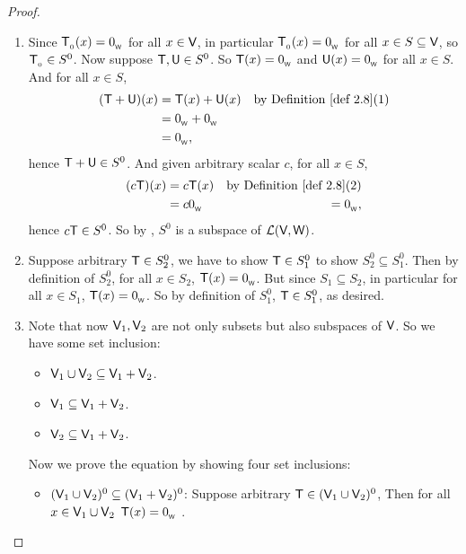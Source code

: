 \begin{proof} \ 
\begin{enumerate}
\item Since \(\textsf{T}_{_0}(x) = 0_{_{\textsf{W}}}\) for all \(x \in \textsf{V}\), in particular \(\textsf{T}_{_0}(x) = 0_{_{\textsf{W}}}\) for all \(x \in S \subseteq \textsf{V}\), so \(\textsf{T}_{_0} \in S^0\).
    Now suppose \(\textsf{T}, \textsf{U} \in S^0\).
    So \(\textsf{T}(x) = 0_{_{\textsf{W}}}\) and \(\textsf{U}(x) = 0_{_{\textsf{W}}}\) for all \(x \in S\).
    And for all \(x \in S\),
    \begin{align*}
        (\T + \U)(x) & = \T(x) + \U(x) & \text{by \DEF{2.8}(1)} \\
                     & = \OW + \OW \\
                     & = \OW,
    \end{align*}
    hence \(\textsf{T} + \textsf{U} \in S^0\).
    And given arbitrary scalar \(c\), for all \(x \in S\),
    \begin{align*}
        (c\T)(x) & = c\T(x) & \text{by \DEF{2.8}(2)} \\
                     & = c\OW
                     & = \OW,
    \end{align*}
    hence \(c\textsf{T}\in S^0\).
    So by , \(S^0\) is a subspace of \(\mathcal{L}(\textsf{V}, \textsf{W})\).

\item Suppose arbitrary \(\textsf{T} \in S^0_2\), we have to show \(\textsf{T} \in S^0_1\) to show \(S^0_2 \subseteq S^0_1\).
Then by definition of \(S^0_2\), for all \(x \in S_2\), \(\textsf{T}(x) = 0_{_{\textsf{W}}}\).
But since \(S_1 \subseteq S_2\), in particular for all \(x \in S_1\), \(\textsf{T}(x) = 0_{_{\textsf{W}}}\).
So by definition of \(S^0_1\), \(\textsf{T} \in S^0_1\), as desired.

\item Note that now \(\textsf{V}_1, \textsf{V}_2\) are not only subsets but also subspaces of \(\textsf{V}\).
So we have some set inclusion:
\begin{itemize}
    \item \(\textsf{V}_1 \cup \textsf{V}_2 \subseteq \textsf{V}_1 + \textsf{V}_2\).
    \item \(\textsf{V}_1 \subseteq \textsf{V}_1 + \textsf{V}_2\).
    \item \(\textsf{V}_2 \subseteq \textsf{V}_1 + \textsf{V}_2\).
\end{itemize}

Now we prove the equation by showing four set inclusions:
\begin{itemize}
    \item \((\textsf{V}_1 \cup \textsf{V}_2)^0 \subseteq (\textsf{V}_1 + \textsf{V}_2)^0\):
        Suppose arbitrary \(\textsf{T} \in (\textsf{V}_1 \cup \textsf{V}_2)^0\),
        Then for all \(x \in \textsf{V}_1 \cup \textsf{V}_2\) \(\textsf{T}(x) = 0_{_{\textsf{W}}}\) .
        

\end{itemize}
\end{enumerate}
\end{proof}
